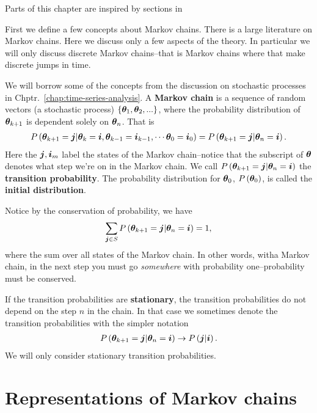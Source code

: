 Parts of this chapter are inspired by sections in \cite{zhou2008practical,feller1968introduction}

First we define a few concepts about Markov chains.
There is a large literature on Markov chains. 
Here we discuss only a few aspects of the theory. 
In particular we will only discuss discrete Markov chains--that is Markov chains where that make discrete jumps in time.

We will borrow some of the concepts from the discussion on stochastic processes in Chptr.~\ref{chap:time-series-analysis}.
A \textbf{Markov chain} is a sequence of random vectors (a stochastic process) $\left\{{\bm \theta}_1,{\bm \theta}_2,...\right\}$, where the probability distribution of ${\bm \theta}_{k+1}$ is dependent solely on ${\bm \theta}_n$.
That is 
\begin{align}
    P\left({\bm \theta}_{k+1}={\bm j}|{\bm \theta}_{k}={\bm i}, {\bm \theta}_{k-1} = {\bm i}_{k-1}, \cdots {\bm \theta}_{0} = {\bm i}_0\right) 
     =
     P\left({\bm \theta}_{k+1}={\bm j}|{\bm \theta}_n={\bm i}\right)
     .
\end{align}
Here the ${\bm j},{\bm i}_m$ label the states of the Markov chain--notice that the subscript of ${\bm \theta}$ denotes what step we're on in the Markov chain. 
We call $P\left({\bm \theta}_{k+1}={\bm j}|{\bm \theta}_n={\bm i}\right)$ the \textbf{transition probability}. 
The probability distribution for ${\bm \theta}_0$, $P\left({\bm \theta}_0\right)$, is called the \textbf{initial distribution}.

Notice by the conservation of probability, we have
\begin{align}
    \label{eq:conservation-of-probability}
    \sum_{{\bm j}\in S}P\left({\bm \theta}_{k+1}={\bm j}|{\bm \theta}_n={\bm i}\right)
    =
    1
    ,
\end{align}
where the sum over all states of the Markov chain.
In other words, witha Markov chain, in the next step you must go \emph{somewhere} with probability one--probability must be conserved.


If the transition probabilities are \textbf{stationary}, the transition probabilities do not depend on the step $n$ in the chain.
In that case we sometimes denote the transition probabilities with the simpler notation 
\begin{align}
     P\left({\bm \theta}_{k+1}={\bm j}|{\bm \theta}_n={\bm i}\right)
     \to
     P\left({\bm j}|{\bm i}\right)
    .
\end{align}
We will only consider stationary transition probabilities.
\section{Representations of Markov chains\label{sec:representations-markov-chains}}

